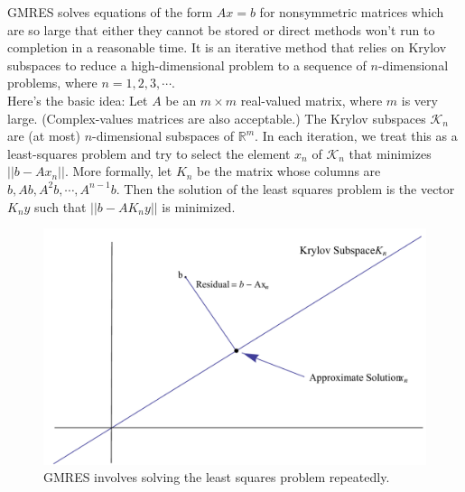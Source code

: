 \label{lab:GMRES}

GMRES solves equations of the form $Ax=b$ for nonsymmetric matrices which are so large that either they cannot be stored or direct methods won't run to completion in a reasonable time.
It is an iterative method that relies on Krylov subspaces to reduce a high-dimensional problem to a sequence of $n$-dimensional problems, where $n=1,2,3,\cdots$. \\
\indent Here's the basic idea: Let $A$ be an $m\times m$ real-valued matrix, where $m$ is very large.
(Complex-values matrices are also acceptable.)
The Krylov subspaces $\mathcal{K}_n$ are (at most) $n$-dimensional subspaces of $\mathbb{R}^m$.
In each iteration, we treat this as a least-squares problem and try to select the element $x_n$ of $\mathcal{K}_n$ that minimizes $||b-Ax_n||$.
More formally, let $K_n$ be the matrix whose columns are $b,Ab,A^2b,\cdots,  A^{n-1}b.$
Then the solution of the least squares problem is the vector $K_ny$ such that $||b-AK_ny||$ is minimized.\\

\begin{figure}[h!]
\includegraphics[width=.7\textwidth]{LeastSquares}
\caption{GMRES involves solving the least squares problem repeatedly.}
\end{figure}

